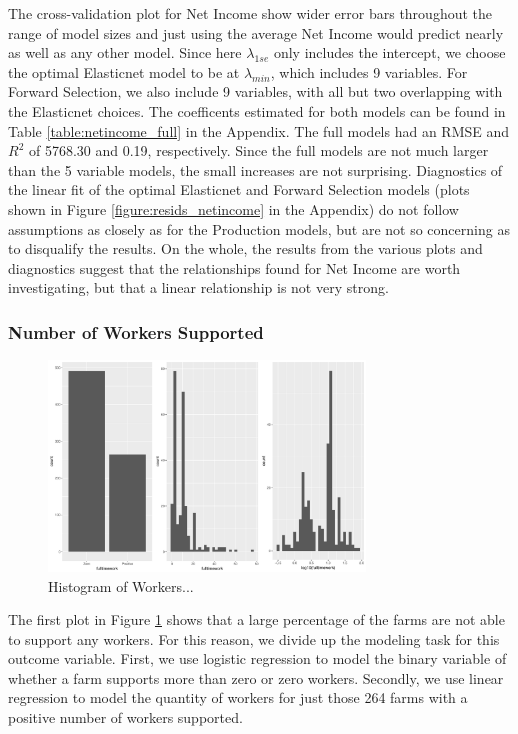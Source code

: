 \documentclass{article}
\begin{document}
The cross-validation plot for Net Income show wider error bars throughout the range of model sizes and just using the average 
Net Income would predict nearly as well as any other model. Since here $\lambda_{1se}$ only includes the intercept, we 
choose the optimal Elasticnet model to be at $\lambda_{min}$, which includes 9 variables. For Forward Selection, we also 
include 9 variables, with all but two overlapping with the Elasticnet choices. The coefficents estimated for both models can be 
found in Table \ref{table:netincome_full} in the Appendix. The full models had an RMSE and $R^2$ of 5768.30 and 0.19, 
respectively. Since the full models are not much larger than the 5 variable models, the small increases are not surprising. Diagnostics of the linear fit of the optimal Elasticnet and Forward Selection models (plots shown in Figure 
\ref{figure:resids_netincome} in the Appendix) do not follow assumptions as closely as for the Production models, but are not so 
concerning as to disqualify the results. On the whole, the results from the various plots and diagnostics suggest that the relationships found for Net Income are worth investigating, but that a linear relationship is not very strong.


\subsubsection{Number of Workers Supported}

\begin{figure}[h]
\centering
\includegraphics[width = 0.75\textwidth]{worker_histograms.pdf}
\caption{Histogram of Workers...}
\label{figure:workers_hist}
\end{figure}

The first plot in Figure \ref{figure:workers_hist} shows that a large percentage of the farms are not able to support any workers. 
For this reason, we divide up the modeling task for this outcome variable. First, we use logistic regression to model the binary 
variable of whether a farm supports more than zero or zero workers. Secondly, we use linear regression to model the quantity 
of workers for just those 264 farms with a positive number of workers supported.
\end{document}
